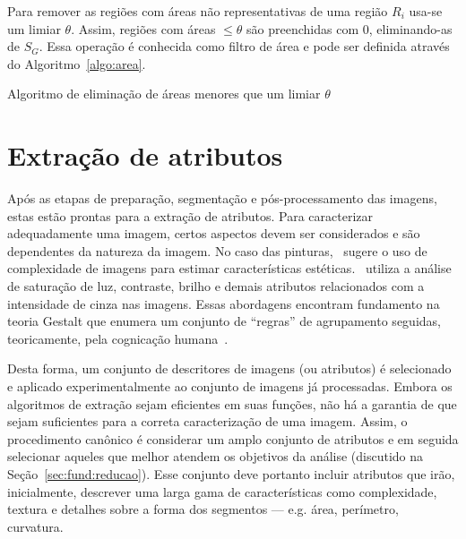 Para remover as regiões com áreas não representativas de uma região
$R_i$ usa-se um limiar $\theta$. Assim, regiões com áreas $\leq
\theta$ são preenchidas com $0$, eliminando-as de $S_G$. Essa operação
é conhecida como filtro de área e pode ser definida através do
Algoritmo~\ref{algo:area}.

\begin{espacosimples}
\begin{algorithm2e}[H]
  \caption{Algoritmo de eliminação de áreas menores que um limiar $\theta$}
  \label{algo:area}
  \SetAlgoLined

\end{algorithm2e}
\end{espacosimples}
             
\section{Extração de atributos}
\label{sec:atributos}

Após as etapas de preparação, segmentação e pós-processamento das
imagens, estas estão prontas para a extração de atributos. Para
caracterizar adequadamente uma imagem, certos aspectos devem ser
considerados e são dependentes da natureza da imagem. No caso das
pinturas,~\citeauthor{penousal} sugere o uso de complexidade de
imagens para estimar características
estéticas.~\citeauthor{manovich,manovich2,manovich3} utiliza a análise
de saturação de luz, contraste, brilho e demais atributos relacionados
com a intensidade de cinza nas imagens.  Essas abordagens encontram
fundamento na teoria Gestalt que enumera um conjunto de ``regras'' de
agrupamento seguidas, teoricamente, pela cognicação
humana~\cite{haralick}.


Desta forma, um conjunto de descritores de imagens (ou atributos) é
selecionado e aplicado experimentalmente ao conjunto de imagens já
processadas. Embora os algoritmos de extração sejam eficientes em suas
funções, não há a garantia de que sejam suficientes para a correta
caracterização de uma imagem. Assim, o procedimento canônico é
considerar um amplo conjunto de atributos e em seguida selecionar
aqueles que melhor atendem os objetivos da análise (discutido na
Seção~\ref{sec:fund:reducao}). Esse conjunto deve portanto incluir
atributos que irão, inicialmente, descrever uma larga gama de
características como complexidade, textura e detalhes sobre a forma
dos segmentos --- e.g. área, perímetro, curvatura.

